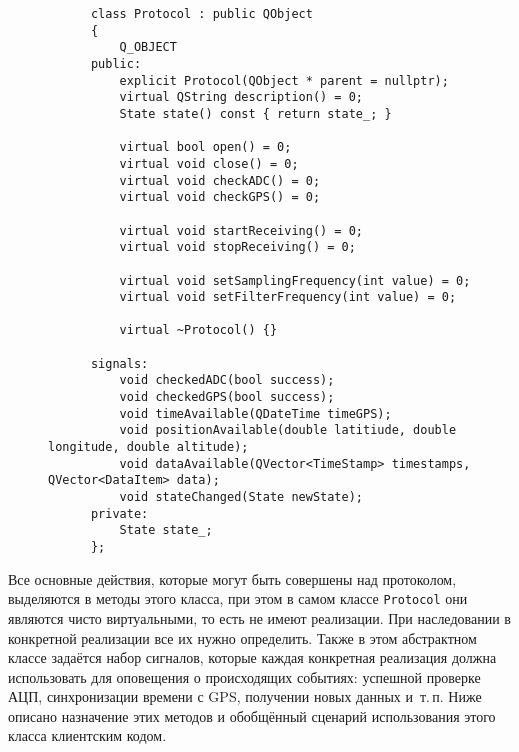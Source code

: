 \documentclass[a4paper, 14pt, titlepage]{extarticle}
\newcommand{\inlinecode}[1]{\lstinline[basicstyle=\ttfamily]{#1}}
\newenvironment{myfigure}[2]%
    {\pushQED{\caption{#1} \label{#2}} %
     \begin{figure}[!htb]\centering } %
    {  \popQED %
     \end{figure}}
\begin{document}
  \begin{myfigure}{Абстрактный класс Protocol}{fig:src-protocol}
    \begin{lstlisting}
      class Protocol : public QObject
      {
          Q_OBJECT
      public:
          explicit Protocol(QObject * parent = nullptr);
          virtual QString description() = 0;
          State state() const { return state_; }

          virtual bool open() = 0;
          virtual void close() = 0;
          virtual void checkADC() = 0;
          virtual void checkGPS() = 0;

          virtual void startReceiving() = 0;
          virtual void stopReceiving() = 0;

          virtual void setSamplingFrequency(int value) = 0;
          virtual void setFilterFrequency(int value) = 0;

          virtual ~Protocol() {}

      signals:
          void checkedADC(bool success);
          void checkedGPS(bool success);
          void timeAvailable(QDateTime timeGPS);
          void positionAvailable(double latitiude, double longitude, double altitude);
          void dataAvailable(QVector<TimeStamp> timestamps, QVector<DataItem> data);
          void stateChanged(State newState);
      private:
          State state_;
      };
    \end{lstlisting}
  \end{myfigure}

  Все основные действия, которые могут быть совершены над протоколом, выделяются в методы этого
  класса, при этом в самом классе \inlinecode{Protocol} они являются чисто виртуальными, то есть не
  имеют реализации. При наследовании в конкретной реализации все их нужно определить.
  Также в этом абстрактном классе задаётся набор сигналов, которые каждая конкретная реализация
  должна использовать для оповещения о происходящих событиях: успешной проверке АЦП, синхронизации
  времени с GPS, получении новых данных и~т.\,п.
  Ниже описано назначение этих методов и обобщённый сценарий использования этого класса клиентским кодом.
\end{document}
